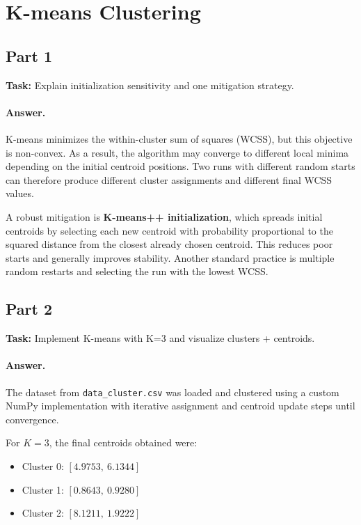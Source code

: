 \section{K-means Clustering}

\subsection{Part 1}
\textbf{Task:} Explain initialization sensitivity and one mitigation strategy.

\paragraph{Answer.}
K-means minimizes the within-cluster sum of squares (WCSS), but this objective is non-convex. As a result, the algorithm may converge to different local minima depending on the initial centroid positions. Two runs with different random starts can therefore produce different cluster assignments and different final WCSS values.

A robust mitigation is \textbf{K-means++ initialization}, which spreads initial centroids by selecting each new centroid with probability proportional to the squared distance from the closest already chosen centroid. This reduces poor starts and generally improves stability. Another standard practice is multiple random restarts and selecting the run with the lowest WCSS.

\subsection{Part 2}
\textbf{Task:} Implement K-means with K=3 and visualize clusters + centroids.

\paragraph{Answer.}
The dataset from \texttt{data\_cluster.csv} was loaded and clustered using a custom NumPy implementation with iterative assignment and centroid update steps until convergence.

For \(K=3\), the final centroids obtained were:
\begin{itemize}
  \item Cluster 0: \([4.9753,\ 6.1344]\)
  \item Cluster 1: \([0.8643,\ 0.9280]\)
  \item Cluster 2: \([8.1211,\ 1.9222]\)
\end{itemize}

